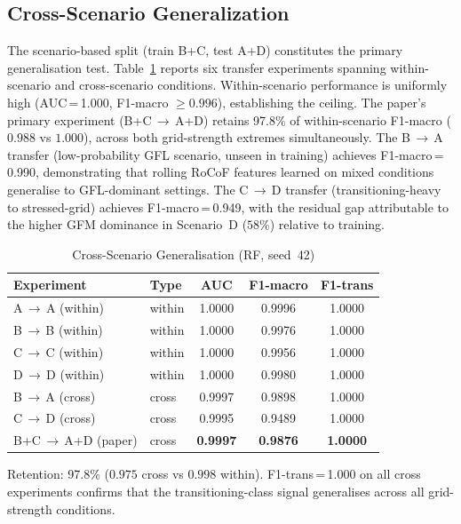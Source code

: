 \documentclass[journal]{IEEEtran}
\begin{document}
\subsection{Cross-Scenario Generalization}
\label{sec:cross}

The scenario-based split (train B+C, test A+D) constitutes the primary
generalisation test.
Table~\ref{tab:cross} reports six transfer experiments spanning within-scenario
and cross-scenario conditions.
Within-scenario performance is uniformly high (AUC\,=\,1.000, F1-macro
$\geq 0.996$), establishing the ceiling.
The paper's primary experiment (B+C\,$\rightarrow$\,A+D) retains
97.8\% of within-scenario F1-macro ($0.988$ vs $1.000$), across both
grid-strength extremes simultaneously.
The B\,$\rightarrow$\,A transfer (low-probability GFL scenario, unseen in
training) achieves F1-macro\,=\,0.990, demonstrating that rolling RoCoF
features learned on mixed conditions generalise to GFL-dominant settings.
The C\,$\rightarrow$\,D transfer (transitioning-heavy to stressed-grid)
achieves F1-macro\,=\,0.949, with the residual gap attributable to the
higher GFM dominance in Scenario~D ($58\%$) relative to training.

\begin{table}[!t]
\renewcommand{\arraystretch}{1.25}
\caption{Cross-Scenario Generalisation (RF, seed~42)}
\label{tab:cross}
\centering
\begin{tabular}{@{}llccc@{}}
\toprule
Experiment & Type & AUC & F1-macro & F1-trans \\
\midrule
A\,$\rightarrow$\,A (within) & within & 1.0000 & 0.9996 & 1.0000 \\
B\,$\rightarrow$\,B (within) & within & 1.0000 & 0.9976 & 1.0000 \\
C\,$\rightarrow$\,C (within) & within & 1.0000 & 0.9956 & 1.0000 \\
D\,$\rightarrow$\,D (within) & within & 1.0000 & 0.9980 & 1.0000 \\
B\,$\rightarrow$\,A (cross)  & cross  & 0.9997 & 0.9898 & 1.0000 \\
C\,$\rightarrow$\,D (cross)  & cross  & 0.9995 & 0.9489 & 1.0000 \\
B+C\,$\rightarrow$\,A+D (paper) & cross & \textbf{0.9997} & \textbf{0.9876} & \textbf{1.0000} \\
\bottomrule
\end{tabular}
\begin{tablenotes}
\small
\item Retention: 97.8\% ($0.975$ cross vs $0.998$ within).
      F1-trans\,=\,1.000 on all cross experiments confirms that the
      transitioning-class signal generalises across all grid-strength conditions.
\end{tablenotes}
\end{table}
\end{document}
